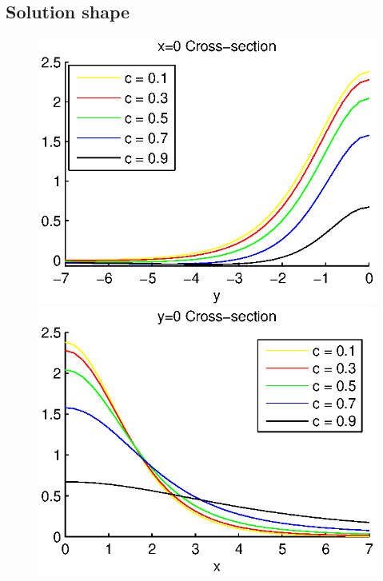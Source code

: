 \documentclass[preprint]{elsarticle}
\begin{document}
\subsection{Solution shape}

\begin{figure}[ht]
	\begin{minipage}[b]{0.5\linewidth}
		\raggedleft
		\includegraphics[width=\linewidth]{cross-sections/c=01__09beta=1x=0.eps}
	\end{minipage}	
	\begin{minipage}[b]{0.5\linewidth}
		\raggedright
		 \includegraphics[width=\linewidth]{cross-sections/c=01__09beta=1y=0.eps}

\end{minipage}
\end{figure}
\end{document}
